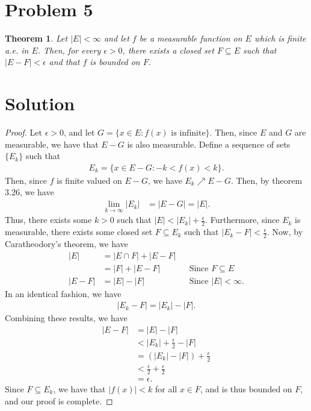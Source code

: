 \documentclass[10pt,a4paper]{article}
\theoremstyle{theorem}
\newtheorem{theorem}{Theorem}
\theoremstyle{definition}
\begin{document}
\section*{Problem 5}
\begin{theorem}
Let $|E| < \infty$ and let $f$ be a measurable function on $E$ which is finite a.e. in $E$. Then, for every $\epsilon >0$, there exists a closed set $F \subseteq E$ such that $|E - F| < \epsilon$ and that $f$ is bounded on $F$.
\end{theorem}

\section*{Solution}
\begin{proof}
Let $\epsilon > 0$, and let $G = \{x \in E: f(x) \text{ is infinite} \}$. Then, since $E$ and $G$ are measurable, we have that $E - G$ is also measurable. Define a sequence of sets $\{E_k\}$ such that
\begin{align*}
E_k = \{x \in E - G: -k < f(x) < k \}.
\end{align*}
Then, since $f$ is finite valued on $E - G$, we have $E_k \nearrow E - G$. Then, by theorem 3.26, we have
\begin{align*}
\lim_{k \to \infty} |E_k| &= |E - G| = |E|.
\end{align*}
Thus, there exists some $k > 0$ such that $|E| < |E_k| + \frac{\epsilon}{2}$. Furthermore, since $E_k$ is measurable, there exists some closed set $F \subseteq E_k$ such that $|E_k - F| < \frac{\epsilon}{2}$.  Now, by Caratheodory's theorem, we have
\begin{align*}
|E| &= |E \cap F| + |E - F|\\
&= |F| + |E - F| &&\text{Since } F \subseteq E\\
|E - F| &= |E| - |F| &&\text{Since } |E| < \infty.
\end{align*}
In an identical fashion, we have
\begin{align*}
|E_k - F| = |E_k| - |F|.
\end{align*}
Combining these results, we have
\begin{align*}
|E - F| &= |E| - |F|\\
&< |E_k| + \frac{\epsilon}{2} - |F|\\
&= (|E_k| - |F|) + \frac{\epsilon}{2}\\
&< \frac{\epsilon}{2} + \frac{\epsilon}{2}\\
&= \epsilon.
\end{align*}
Since $F \subseteq E_k$, we have that $|f(x)| < k$ for all $x \in F$, and is thus bounded on $F$, and our proof is complete.
\end{proof}
\end{document}
